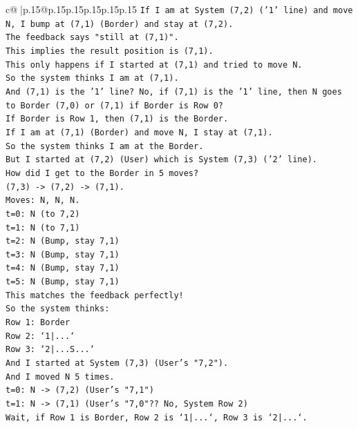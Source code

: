 \documentclass{article}
\begin{document}
{\begin{supertabular}{c@{$\;$}|p{.15\linewidth}@{}p{.15\linewidth}p{.15\linewidth}p{.15\linewidth}p{.15\linewidth}p{.15\linewidth}}
{{{\texttt{If I am at System (7,2) ('1' line) and move N, I bump at (7,1) (Border) and stay at (7,2).} \\
\texttt{The feedback says "still at (7,1)".} \\
\texttt{This implies the result position is (7,1).} \\
\texttt{This only happens if I started at (7,1) and tried to move N.} \\
\texttt{So the system thinks I am at (7,1).} \\
\texttt{And (7,1) is the '1' line? No, if (7,1) is the '1' line, then N goes to Border (7,0) or (7,1) if Border is Row 0?} \\
\texttt{If Border is Row 1, then (7,1) is the Border.} \\
\texttt{If I am at (7,1) (Border) and move N, I stay at (7,1).} \\
\texttt{So the system thinks I am at the Border.} \\
\texttt{But I started at (7,2) (User) which is System (7,3) ('2' line).} \\
\texttt{How did I get to the Border in 5 moves?} \\
\texttt{(7,3) {-}> (7,2) {-}> (7,1).} \\
\texttt{Moves: N, N, N.} \\
\texttt{t=0: N (to 7,2)} \\
\texttt{t=1: N (to 7,1)} \\
\texttt{t=2: N (Bump, stay 7,1)} \\
\texttt{t=3: N (Bump, stay 7,1)} \\
\texttt{t=4: N (Bump, stay 7,1)} \\
\texttt{t=5: N (Bump, stay 7,1)} \\
\texttt{This matches the feedback perfectly!} \\
\texttt{So the system thinks:} \\
\texttt{Row 1: Border} \\
\texttt{Row 2: `1|...`} \\
\texttt{Row 3: `2|...S...`} \\
\texttt{And I started at System (7,3) (User's "7,2").} \\
\texttt{And I moved N 5 times.} \\
\texttt{t=0: N {-}> (7,2) (User's "7,1")} \\
\texttt{t=1: N {-}> (7,1) (User's "7,0"?? No, System Row 2)} \\
\texttt{Wait, if Row 1 is Border, Row 2 is `1|...`, Row 3 is `2|...`.} \\
}}}
\end{supertabular}}
\end{document}
